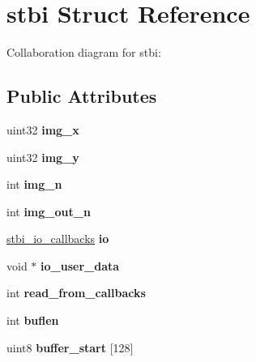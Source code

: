 \hypertarget{structstbi}{\section{stbi Struct Reference}
\label{structstbi}
}


Collaboration diagram for stbi\+:
\subsection*{Public Attributes}
\begin{DoxyCompactItemize}
\item 
\hypertarget{structstbi_af3b42c257fb0d8896f29ca3921540a42}{uint32 {\bfseries img\+\_\+x}}\label{structstbi_af3b42c257fb0d8896f29ca3921540a42}

\item 
\hypertarget{structstbi_a60cb5a630e268b2d12306c6eca246dd1}{uint32 {\bfseries img\+\_\+y}}\label{structstbi_a60cb5a630e268b2d12306c6eca246dd1}

\item 
\hypertarget{structstbi_ae22cfcc23f5ab67bede22942333ecbd7}{int {\bfseries img\+\_\+n}}\label{structstbi_ae22cfcc23f5ab67bede22942333ecbd7}

\item 
\hypertarget{structstbi_a33f6519d8f99b84afbde795dc7a931f2}{int {\bfseries img\+\_\+out\+\_\+n}}\label{structstbi_a33f6519d8f99b84afbde795dc7a931f2}

\item 
\hypertarget{structstbi_a86596e1eb2b0f57a60a18777bd37ff53}{\hyperlink{structstbi__io__callbacks}{stbi\+\_\+io\+\_\+callbacks} {\bfseries io}}\label{structstbi_a86596e1eb2b0f57a60a18777bd37ff53}

\item 
\hypertarget{structstbi_a9838a0c89630f283c25a16f4e30f40aa}{void $\ast$ {\bfseries io\+\_\+user\+\_\+data}}\label{structstbi_a9838a0c89630f283c25a16f4e30f40aa}

\item 
\hypertarget{structstbi_acb201cc1b3eb134f342cee89f5d11e70}{int {\bfseries read\+\_\+from\+\_\+callbacks}}\label{structstbi_acb201cc1b3eb134f342cee89f5d11e70}

\item 
\hypertarget{structstbi_a76d6f761529ecff7f02469b19371af0e}{int {\bfseries buflen}}\label{structstbi_a76d6f761529ecff7f02469b19371af0e}

\item 
\hypertarget{structstbi_af99edda496281a6ca1b58271cabdbc69}{uint8 {\bfseries buffer\+\_\+start} \mbox{[}128\mbox{]}}\label{structstbi_af99edda496281a6ca1b58271cabdbc69}


\end{DoxyCompactItemize}
